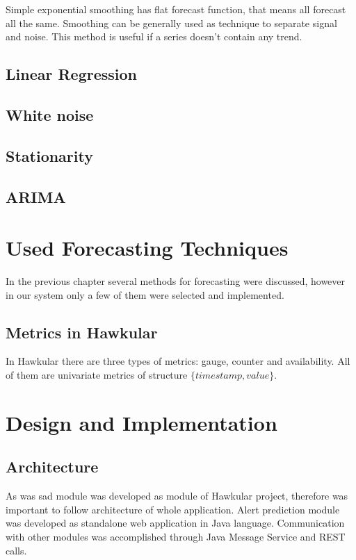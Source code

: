 Simple exponential smoothing has flat forecast function, that means all forecast
all the same. Smoothing can be generally used as technique to separate signal and noise.
This method is useful if a series doesn't contain any trend.

\section{Linear Regression}

\section{White noise}
\section{Stationarity}

\section{ARIMA}
\chapter{Used Forecasting Techniques}
In the previous chapter several methods for forecasting were discussed, however
in our system only a few of them were selected and implemented.

\section{Metrics in Hawkular}
In Hawkular there are three types of metrics: gauge, counter and availability. 
All of them are univariate metrics of structure $ \{timestamp, value\} $.

\chapter{Design and Implementation}
\section{Architecture}
As was sad module was developed as module of Hawkular project, therefore was
important to follow architecture of whole application. Alert prediction module
was developed as standalone web application in Java language. Communication with
other modules was accomplished through Java Message Service and REST calls. 

